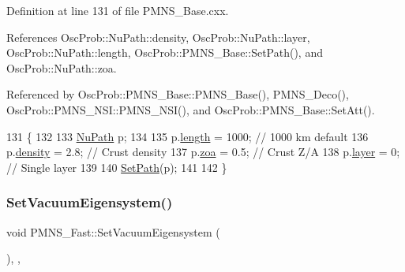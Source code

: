 Definition at line 131 of file P\+M\+N\+S\+\_\+\+Base.\+cxx.



References Osc\+Prob\+::\+Nu\+Path\+::density, Osc\+Prob\+::\+Nu\+Path\+::layer, Osc\+Prob\+::\+Nu\+Path\+::length, Osc\+Prob\+::\+P\+M\+N\+S\+\_\+\+Base\+::\+Set\+Path(), and Osc\+Prob\+::\+Nu\+Path\+::zoa.



Referenced by Osc\+Prob\+::\+P\+M\+N\+S\+\_\+\+Base\+::\+P\+M\+N\+S\+\_\+\+Base(), P\+M\+N\+S\+\_\+\+Deco(), Osc\+Prob\+::\+P\+M\+N\+S\+\_\+\+N\+S\+I\+::\+P\+M\+N\+S\+\_\+\+N\+S\+I(), and Osc\+Prob\+::\+P\+M\+N\+S\+\_\+\+Base\+::\+Set\+Att().


\begin{DoxyCode}
131                           \{
132 
133   \hyperlink{structOscProb_1_1NuPath}{NuPath} p;
134 
135   p.\hyperlink{structOscProb_1_1NuPath_af22660894b6e25cf835500381b155557}{length}  = 1000; \textcolor{comment}{// 1000 km default}
136   p.\hyperlink{structOscProb_1_1NuPath_a54ddd451db69bc54434de3cf18a117ca}{density} = 2.8;  \textcolor{comment}{// Crust density}
137   p.\hyperlink{structOscProb_1_1NuPath_af3213f3691ba83c6bc05f4a3490f6b31}{zoa}     = 0.5;  \textcolor{comment}{// Crust Z/A}
138   p.\hyperlink{structOscProb_1_1NuPath_a442b160899e554ad1d800989510d5309}{layer}   = 0;    \textcolor{comment}{// Single layer}
139 
140   \hyperlink{classOscProb_1_1PMNS__Base_ac3b644fd0a56347d304ceca4ae9d8875}{SetPath}(p);
141 
142 \}
\end{DoxyCode}
\mbox{\label{classOscProb_1_1PMNS__Fast_a76dd5a761df8689c502b28ad0391f9e2}} 
\subsubsection{\texorpdfstring{Set\+Vacuum\+Eigensystem()}{SetVacuumEigensystem()}}
{\footnotesize\ttfamily void P\+M\+N\+S\+\_\+\+Fast\+::\+Set\+Vacuum\+Eigensystem (\begin{DoxyParamCaption}{ }\end{DoxyParamCaption})\hspace{0.3cm}{\ttfamily [protected]}, {\ttfamily [virtual]}, {\ttfamily [inherited]}}


